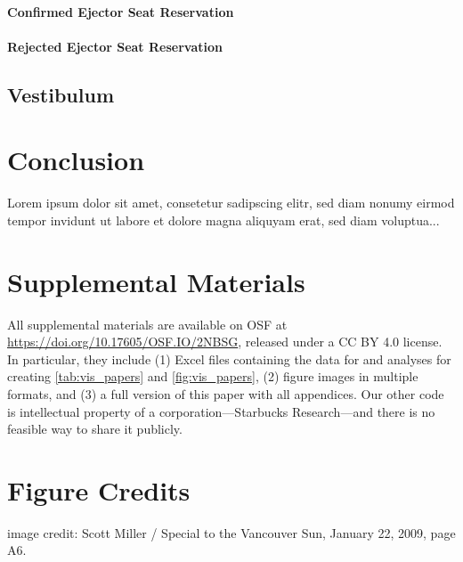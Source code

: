 \documentclass[journal]{vgtc}                %
\begin{document}
\paragraph{Confirmed Ejector Seat Reservation}

\lipsum[1]

\paragraph{Rejected Ejector Seat Reservation}

\lipsum[1]

\subsection{Vestibulum}

\lipsum

\section{Conclusion}

Lorem ipsum dolor sit amet, consetetur sadipscing elitr, sed diam nonumy eirmod tempor invidunt ut labore et dolore magna aliquyam erat, sed diam voluptua...




\section*{Supplemental Materials}
\label{sec:supplemental_materials}

All supplemental materials are available on OSF at \url{https://doi.org/10.17605/OSF.IO/2NBSG}, released under a CC BY 4.0 license.
In particular, they include (1) Excel files containing the data for and analyses for creating \cref{tab:vis_papers} and \cref{fig:vis_papers}, (2) figure images in multiple formats, and (3) a full version of this paper with all appendices.
Our other code is intellectual property of a corporation---Starbucks Research---and there is no feasible way to share it publicly.


\section*{Figure Credits}

 image credit: Scott Miller / Special to the Vancouver Sun, January 22, 2009, page A6.
\end{document}
